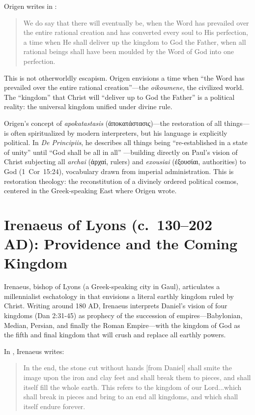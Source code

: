 Origen writes in \cite[8.68]{origen:contracels}:

\begin{quote}
We do say that there will eventually be, when the Word has prevailed over the entire rational creation and has converted every soul to His perfection, a time when He shall deliver up the kingdom to God the Father, when all rational beings shall have been moulded by the Word of God into one perfection.
\end{quote}

This is not otherworldly escapism.
Origen envisions a time when ``the Word has prevailed over the entire rational creation''---the \emph{oikoumene}, the civilized world.
The ``kingdom'' that Christ will ``deliver up to God the Father'' is a political reality: the universal kingdom unified under divine rule.

Origen's concept of \emph{apokatastasis} (ἀποκατάστασις)---the restoration of all things---is often spiritualized by modern interpreters, but his language is explicitly political.
In \emph{De Principiis}, he describes all things being ``re-established in a state of unity'' until ``God shall be all in all'' \cite[3.6.6]{origen:principiis}---building directly on Paul's vision of Christ subjecting all \emph{archai} (ἀρχαί, rulers) and \emph{exousiai} (ἐξουσίαι, authorities) to God (1~Cor~15:24), vocabulary drawn from imperial administration.
This is restoration theology: the reconstitution of a divinely ordered political cosmos, centered in the Greek-speaking East where Origen wrote.

\section{Irenaeus of Lyons (c.~130--202 AD): Providence and the Coming Kingdom}\label{sec:irenaeus-providence-kingdom}

Irenaeus, bishop of Lyons (a Greek-speaking city in Gaul), articulates a millennialist eschatology in \cite{irenaeus:advhaer} that envisions a literal earthly kingdom ruled by Christ.
Writing around 180 AD, Irenaeus interprets Daniel's vision of four kingdoms (Dan 2:31-45) as prophecy of the succession of empires---Babylonian, Median, Persian, and finally the Roman Empire---with the kingdom of God as the fifth and final kingdom that will crush and replace all earthly powers.

In \cite[5.26.1]{irenaeus:advhaer}, Irenaeus writes:

\begin{quote}
In the end, the stone cut without hands [from Daniel] shall smite the image upon the iron and clay feet and shall break them to pieces, and shall itself fill the whole earth.
This refers to the kingdom of our Lord...which shall break in pieces and bring to an end all kingdoms, and which shall itself endure forever.
\end{quote}

